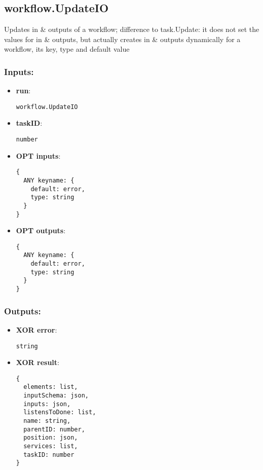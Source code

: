 \subsection{workflow.UpdateIO}
\label{ch:builtinservices:workflow.UpdateIO}
Updates
 in \& outputs of a workflow; difference to task.Update: it does not 
set the values for in \& outputs, but actually creates in \& 
outputs dynamically for a workflow, its key, type and default value
\subsubsection*{Inputs:}
\begin{itemize}
  \small
    \item \textbf{run}: 
\begin{lstlisting}
workflow.UpdateIO
\end{lstlisting}
    \item \textbf{taskID}: 
\begin{lstlisting}
number
\end{lstlisting}
    \item \textbf{OPT inputs}: 
\begin{lstlisting}
{
  ANY keyname: {
    default: error, 
    type: string
  }
}
\end{lstlisting}
    \item \textbf{OPT outputs}: 
\begin{lstlisting}
{
  ANY keyname: {
    default: error, 
    type: string
  }
}
\end{lstlisting}
  \end{itemize}
\subsubsection*{Outputs:}
\begin{itemize}
  \small
    \item \textbf{XOR error}: 
\begin{lstlisting}
string
\end{lstlisting}
    \item \textbf{XOR result}: 
\begin{lstlisting}
{
  elements: list, 
  inputSchema: json, 
  inputs: json, 
  listensToDone: list, 
  name: string, 
  parentID: number, 
  position: json, 
  services: list, 
  taskID: number
}
\end{lstlisting}
  \end{itemize}

